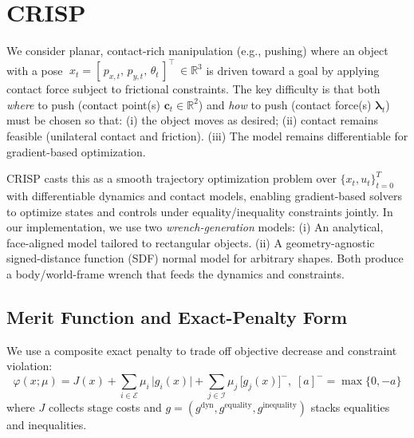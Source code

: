 \documentclass[conference]{IEEEtran}
\begin{document}
\section{CRISP}
\noindent We consider planar, contact-rich manipulation (e.g., pushing) where an object with a pose $\;x_t = [\,p_{x,t},\,p_{y,t},\,\theta_t\,]^\top\,\in \mathbb{R}^3$ is driven toward a goal by applying contact force subject to frictional constraints. The key difficulty is that both \emph{where} to push (contact point(s) $\mathbf{c}_t\in \mathbb{R}^2$) and \emph{how} to push (contact force(s) $\boldsymbol{\lambda}_t$) must be chosen so that: \newline
(i) the object moves as desired; \newline
(ii) contact remains feasible (unilateral contact and friction). \newline
(iii) The model remains differentiable for gradient-based optimization. \newline

\noindent CRISP casts this as a smooth trajectory optimization problem over $\{x_t,u_t\}_{t=0}^{T}$ with differentiable dynamics and contact models, enabling gradient-based solvers to optimize states and controls under equality/inequality constraints jointly. In our implementation, we use two \emph{wrench-generation} models: \newline
(i) An analytical, face-aligned model tailored to rectangular objects. \newline
(ii) A geometry-agnostic signed-distance function (SDF) normal model for arbitrary shapes.
Both produce a body/world-frame wrench that feeds the dynamics and constraints.

\subsection{Merit Function and Exact-Penalty Form}
\noindent We use a composite exact penalty to trade off objective decrease and constraint violation:
\begin{equation}
\label{eq:merit}
\varphi(x;\mu)=J(x)+\!\!\sum_{i\in\mathcal E}\!\mu_i\,\big|g_i(x)\big|
+\!\!\sum_{j\in\mathcal I}\!\mu_j\,\big[g_j(x)\big]^{-},
\; [a]^{-}=\max\{0,-a\}
\end{equation}
where $J$ collects stage costs and $g=(g^{\text{dyn}},g^{\text{equality}},g^{\text{inequality}})$ stacks equalities and inequalities. 

\end{document}
